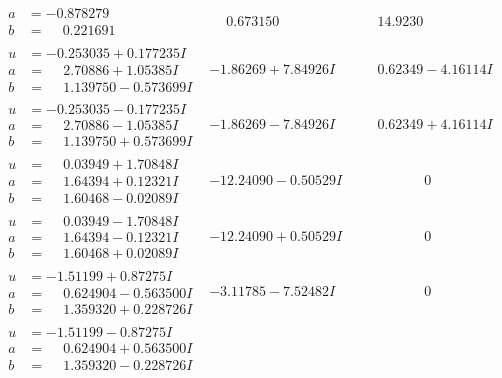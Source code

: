 \documentclass[1p]{elsarticle_modified}
\theoremstyle{definition}
\begin{document}
$$\begin{array}{c|c|c}
\begin{aligned}
a &= -0.878279\phantom{ +0.000000I} \\
b &= \phantom{-}0.221691\phantom{ +0.000000I}\end{aligned}
 & \phantom{-}0.673150\phantom{ +0.000000I} & \phantom{-}14.9230\phantom{ +0.000000I} \\ \hline\begin{aligned}
u &= -0.253035 + 0.177235 I \\
a &= \phantom{-}2.70886 + 1.05385 I \\
b &= \phantom{-}1.139750 - 0.573699 I\end{aligned}
 & -1.86269 + 7.84926 I & \phantom{-}0.62349 - 4.16114 I \\ \hline\begin{aligned}
u &= -0.253035 - 0.177235 I \\
a &= \phantom{-}2.70886 - 1.05385 I \\
b &= \phantom{-}1.139750 + 0.573699 I\end{aligned}
 & -1.86269 - 7.84926 I & \phantom{-}0.62349 + 4.16114 I \\ \hline\begin{aligned}
u &= \phantom{-}0.03949 + 1.70848 I \\
a &= \phantom{-}1.64394 + 0.12321 I \\
b &= \phantom{-}1.60468 - 0.02089 I\end{aligned}
 & -12.24090 - 0.50529 I & \phantom{-0.000000 } 0 \\ \hline\begin{aligned}
u &= \phantom{-}0.03949 - 1.70848 I \\
a &= \phantom{-}1.64394 - 0.12321 I \\
b &= \phantom{-}1.60468 + 0.02089 I\end{aligned}
 & -12.24090 + 0.50529 I & \phantom{-0.000000 } 0 \\ \hline\begin{aligned}
u &= -1.51199 + 0.87275 I \\
a &= \phantom{-}0.624904 - 0.563500 I \\
b &= \phantom{-}1.359320 + 0.228726 I\end{aligned}
 & -3.11785 - 7.52482 I & \phantom{-0.000000 } 0 \\ \hline\begin{aligned}
u &= -1.51199 - 0.87275 I \\
a &= \phantom{-}0.624904 + 0.563500 I \\
b &= \phantom{-}1.359320 - 0.228726 I\end{aligned}

\end{array}$$
\end{document}
